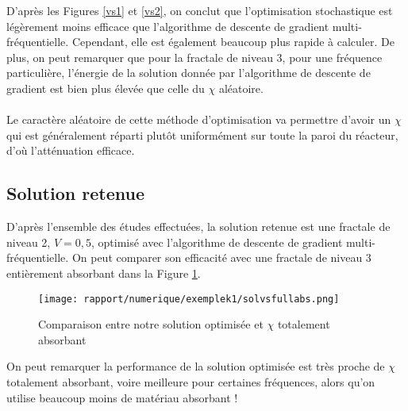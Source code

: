 D'après les Figures \ref{vs1} et \ref{vs2}, on conclut que l'optimisation stochastique est légèrement moins efficace que l'algorithme de descente de gradient multi-fréquentielle. Cependant, elle est également beaucoup plus rapide à calculer. De plus, on peut remarquer que pour la fractale de niveau 3, pour une fréquence particulière, l'énergie de la solution donnée par l'algorithme de descente de gradient est bien plus élevée que celle du $\chi$ aléatoire. \\ \\
Le caractère aléatoire de cette méthode d'optimisation va permettre d'avoir un $\chi$ qui est généralement réparti plutôt uniformément sur toute la paroi du réacteur, d'où l'atténuation efficace.

\subsection{Solution retenue}

D'après l'ensemble des études effectuées, la solution retenue est une fractale de niveau 2, $V = 0,5$, optimisé avec l'algorithme de descente de gradient multi-fréquentielle. On peut comparer son efficacité avec une fractale de niveau 3 entièrement absorbant dans la Figure \ref{abs22}.
\begin{figure}[H]
    \centering
    \texttt{[image: rapport/numerique/exemplek1/solvsfullabs.png]}
    \caption{Comparaison entre notre solution optimisée et $\chi$ totalement absorbant}
    \label{abs22}
\end{figure}
On peut remarquer la performance de la solution optimisée est très proche de $\chi$ totalement absorbant, voire meilleure pour certaines fréquences, alors qu'on utilise beaucoup moins de matériau absorbant ! 

